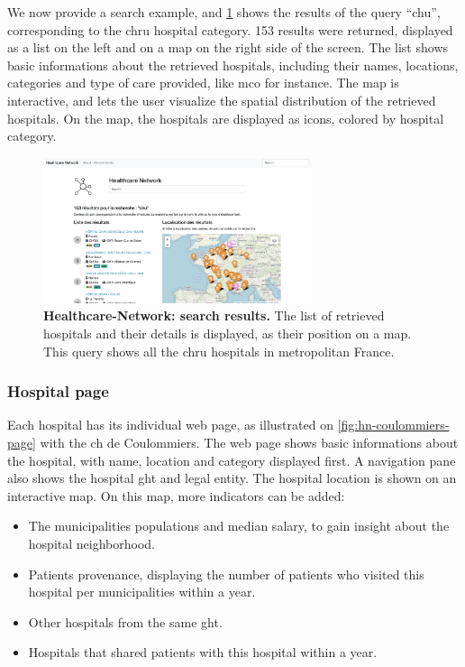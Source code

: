 We now provide a search example, and \cref{fig:hn-search} shows the results of the query ``chu'', corresponding to the \acf{chru} hospital category. 153 results were returned, displayed as a list on the left and on a map on the right side of the screen. The list shows basic informations about the retrieved hospitals, including their names, locations, categories and type of care provided, like \acf{mco} for instance. The map is interactive, and lets the user visualize the spatial distribution of the retrieved hospitals. On the map, the hospitals are displayed as icons, colored by hospital category.

\begin{figure}[H]
    \includegraphics[width=0.7\textwidth]{images/healthcare-network/search.png}
    \centering
    \caption{
        \textbf{Healthcare-Network: search results.} The list of retrieved hospitals and their details is displayed, as their position on a map. This query shows all the \ac{chru} hospitals in metropolitan France.
    }
    \label{fig:hn-search}
\end{figure}

\subsubsection{Hospital page}

Each hospital has its individual web page, as illustrated on \cref{fig:hn-coulommiers-page} with the \ac{ch} de Coulommiers. The web page shows basic informations about the hospital, with name, location and category displayed first. A navigation pane also shows the hospital \ac{ght} and legal entity. The hospital location is shown on an interactive map. On this map, more indicators can be added:

\begin{itemize}
    \item The municipalities populations and median salary, to gain insight about the hospital neighborhood.
    \item Patients provenance, displaying the number of patients who visited this hospital per municipalities within a year.
    \item Other hospitals from the same \ac{ght}.
    \item Hospitals that shared patients with this hospital within a year.
\end{itemize}

